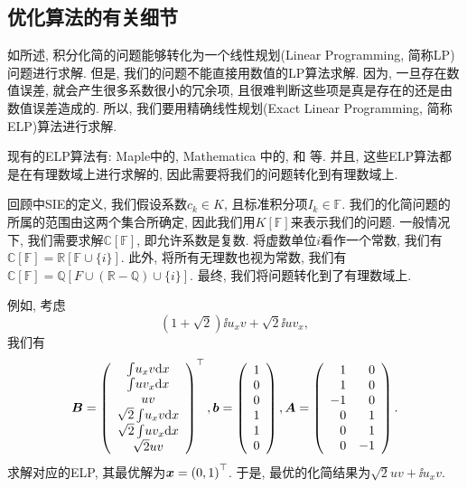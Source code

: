 \subsection{优化算法的有关细节}\label{optMethods-03}

如所述, 积分化简的问题能够转化为一个线性规划(Linear Programming, 简称LP)问题进行求解. 但是, 我们的问题不能直接用数值的LP算法求解. 因为, 一旦存在数值误差, 就会产生很多系数很小的冗余项, 且很难判断这些项是真是存在的还是由数值误差造成的. 所以, 我们要用精确线性规划(Exact Linear Programming, 简称ELP)算法进行求解. 

现有的ELP算法有: Maple中的, Mathematica 中的,  \citep{soplex} 和  \citep{qsoptex} 等. 并且, 这些ELP算法都是在有理数域上进行求解的, 因此需要将我们的问题转化到有理数域上. 

回顾中SIE的定义, 我们假设系数$c_k\in K$, 且标准积分项$I_k\in \mathbb F$. 我们的化简问题的所属的范围由这两个集合所确定, 因此我们用$K[\mathbb F]$来表示我们的问题. 一般情况下, 我们需要求解$\mathbb C[\mathbb F]$, 即允许系数是复数. 将虚数单位$i$看作一个常数, 我们有$\mathbb C[\mathbb F]=\mathbb R[\mathbb F \cup \{i\}]$. 此外, 将所有无理数也视为常数, 我们有$\mathbb C[\mathbb F]=\mathbb Q[F\cup (\mathbb R - \mathbb Q) \cup \{i\}]$. 最终, 我们将问题转化到了有理数域上. 

\begin{example}
例如, 考虑
\begin{equation}
\left(1+\sqrt{2}\right)\ii{u_x v}+\sqrt{2}\ii{u v_x}, 
\end{equation}
我们有 
\begin{equation}
\bm{B}=\left(
\begin{array}{c}
\int\!{u_x v\mathrm{d}x}  \\
\int\!{u v_x\mathrm{d}x}  \\
u v         \\
\sqrt{2}\int\!{u_x v\mathrm{d}x}  \\
\sqrt{2}\int\!{u v_x\mathrm{d}x}  \\
\sqrt{2}u v         \\
\end{array}
\right)^\top,
\bm{b}=\left(
\begin{array}{c}
1   \\
0   \\
0   \\
1   \\
1   \\
0   \\
\end{array}
\right),
\bm{A}=\left(
\begin{array}{rr}
1   & 0\\
1   & 0\\
-1  & 0\\
0   & 1\\
0   & 1\\
0   & -1\\
\end{array}
\right).
\end{equation}
求解对应的ELP, 其最优解为$\bm{x}=\left(0,1\right)^\top$. 于是, 最优的化简结果为$\sqrt{2}uv+\ii{u_x v}$. 
\end{example}


